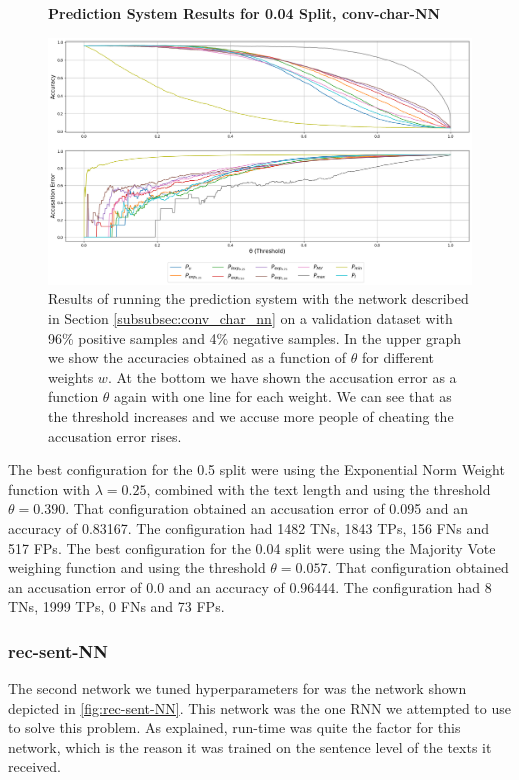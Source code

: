 \begin{figure}
    \centering
    \textbf{Prediction System Results for 0.04 Split, \glsdesc{conv-char-NN}}\par\medskip
    \includegraphics[scale=0.33]{./pictures/experiments/conv_char_nn/prediction_system_04.png}
    \caption{Results of running the prediction system with the network described
        in Section \ref{subsubsec:conv_char_nn} on a validation dataset with
        96\% positive samples and 4\% negative samples. In the upper graph we
        show the accuracies obtained as a function of $\theta$ for different
        weights $w$. At the bottom we have shown the accusation error as a
        function $\theta$ again with one line for each weight. We can see that
        as the threshold increases and we accuse more people of cheating the
        accusation error rises.}
    \label{fig:conv-char-NN-pred-4}
\end{figure}

The best configuration for the 0.5 split were using the Exponential Norm Weight
function with $\lambda = 0.25$, combined with the text length and using the
threshold $\theta = 0.390$. That configuration obtained an accusation error
of 0.095 and an accuracy of 0.83167. The configuration had 1482 \gls{TN}s,
1843 \gls{TP}s, 156 \gls{FN}s and 517 \gls{FP}s. The best configuration for the
0.04 split were using the Majority Vote weighing function
and using the threshold $\theta = 0.057$. That configuration obtained an
accusation error of 0.0 and an accuracy of 0.96444. The configuration
had 8 \gls{TN}s, 1999 \gls{TP}s, 0 \gls{FN}s and 73 \gls{FP}s.

\subsubsection{\glsdesc{rec-sent-NN}}
The second network we tuned hyperparameters for was the network shown
depicted in \ref{fig:rec-sent-NN}. This network was the one \gls{RNN}
we attempted to use to solve this problem. As explained, run-time
was quite the factor for this network, which is the reason it was
trained on the sentence level of the texts it received.

